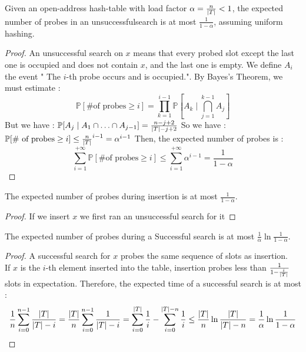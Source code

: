 \documentclass{cours}
\begin{document}
\begin{theorem}[Analysis]
    Given an open-address hash-table with load factor $\alpha = \frac{n}{\left|T\right|} < 1$, the expected number of probes in an unsuccessfulsearch is at most $\frac{1}{1-\alpha}$, assuming uniform hashing. 
\end{theorem}
\begin{proof}
    An unsuccessful search on $x$ means that every probed slot except the last one is occupied and does not contain $x$, and the last one is empty. 
    We define $A_{i}$ the event " The $i$-th probe occurs and is occupied.". By Bayes's Theorem, we must estimate : 
    \[
        \mathbb{P}[\text{\# of probes} \geq i] = \prod_{k = 1}^{i - 1} \mathbb{P}[A_{k} \mid \bigcap\limits_{j = 1}^{k - 1} A_{j}]
    \]
    But we have : $\mathbb{P}[A_{j}\mid A_{1} \cap \ldots \cap A_{j - 1}] = \frac{n - j + 2}{\left|T\right| - j + 2}$
    So we have : $\mathbb{P}[\text{\# of probes} \geq i] \leq \frac{n}{\left|T\right|}^{i - 1} = \alpha^{i - 1}$
    Then, the expected number of probes is : 
    \[
        \sum_{i = 1}^{+\infty} \mathbb{P}[\text{\# of probes} \geq i] \leq \sum_{i = 1}^{+\infty} \alpha^{i - 1} = \frac{1}{1 - \alpha}
    \]
\end{proof}
\begin{corollary}
    The expected number of probes during insertion is at most $\frac{1}{1 - \alpha}$.
\end{corollary}
\begin{proof}
    If we insert $x$ we first ran an unsuccessful search for it
\end{proof}

\begin{theorem}
    The expected number of probes during a Successful search is at most $\frac{1}{\alpha}\ln\frac{1}{1- \alpha}$.
\end{theorem}
\begin{proof}
    A successful search for $x$ probes the same sequence of slots as insertion.\\
    If $x$ is the $i$-th element inserted into the table, insertion probes less than $\frac{1}{1 - \frac{i}{\left|T\right|}}$ slots in expectation.
    Therefore, the expected time of a successful search is at most : 
    \[
        \frac{1}{n}\sum_{i = 0}^{n - 1}\frac{\left|T\right|}{\left|T\right| - i} = \frac{\left|T\right|}{n}\sum_{i = 0}^{n - 1}\frac{1}{\left|T\right| - i} = \sum_{i = 0}^{\left|T\right|}\frac{1}{i} - \sum_{i = 0}^{\left|T\right|-n} \frac{1}{i} \leq \frac{\left|T\right|}{n}\ln\frac{\left|T\right|}{\left|T\right| - n} = \frac{1}{\alpha}\ln\frac{1}{1 - \alpha}
    \]
\end{proof}
\end{document}
